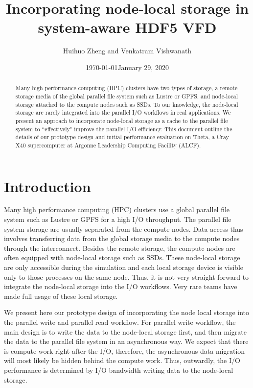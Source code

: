 \documentclass[aps, rmp, 11pt, notitlepage]{revtex4-1}
\begin{document}
\title{Incorporating node-local storage in system-aware HDF5 VFD}
\author{Huihuo Zheng and Venkatram Vishwanath}
\date{\today}
\date{January 29, 2020}
\begin{abstract}
Many high performance computing (HPC) clusters have two types of storage, a remote storage media of the global parallel file system such as Lustre or GPFS, and node-local storage attached to the compute nodes such as SSDs. 
To our knowledge, the node-local storage are rarely integrated into the parallel I/O workflows in real applications.
We present an approach to incorporate node-local storage as a cache to the parallel file system to ``effectively" improve the parallel I/O efficiency. This document outline the details of our prototype design and initial performance evaluation on Theta, a Cray X40 supercomputer at Argonne Leadership Computing Facility (ALCF). 
\end{abstract}
\maketitle
\section{Introduction}
\label{sec:intro}
Many high performance computing (HPC) clusters use a global parallel file system such as Lustre or GPFS for a high I/O throughput. The parallel file system storage are usually separated from the compute nodes. Data access thus involves transferring data from the global storage media to the compute nodes through the interconnect. Besides the remote storage, the compute nodes are often equipped with node-local storage such as SSDs. These node-local storage are only accessible during the simulation and each local storage device is visible only to those processes on the same node. Thus, it is not very straight forward to integrate the node-local storage into the I/O workflows. Very rare teams have made full usage of these local storage. 

We present here our prototype design of incorporating the node local storage into the parallel write and parallel read workflow. For parallel write workflow, the main design is to write the data to the node-local storage first, and then migrate the data to the parallel file system in an asynchronous way. We expect that there is compute work right after the I/O, therefore, the asynchronous data migration will most likely be hidden behind the compute work. Thus, outwardly, the I/O performance is determined by I/O bandwidth writing data to the node-local storage. 
\end{document}
